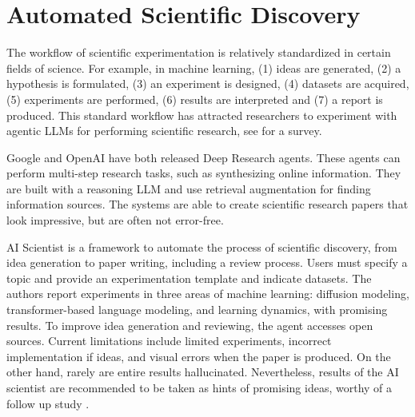 

\section{Automated Scientific Discovery}
The workflow of scientific experimentation is relatively standardized in certain fields of science. For example, in machine learning, (1) ideas are generated, (2) a hypothesis is formulated, (3) an experiment is designed, (4) datasets are acquired, (5) experiments are performed, (6) results are interpreted and (7) a report is produced. This standard workflow has attracted researchers to experiment with agentic LLMs for performing scientific research, see \citet{eger2025transforming} for a survey. 

Google and OpenAI have both released Deep Research agents. These agents can perform multi-step research tasks, such as synthesizing online information. They are built with a reasoning LLM and use retrieval augmentation for finding information sources. The systems are able to create  scientific research papers that look impressive, but are often not error-free. 

AI Scientist \citep{lu2024ai} is a framework to automate the process of scientific discovery, from idea generation to paper writing, including a review process. Users must specify a topic and provide an experimentation template and indicate datasets. The authors report experiments in three areas of machine learning: diffusion
modeling, transformer-based language modeling, and learning dynamics, with promising results. To improve idea generation and reviewing, the agent accesses open sources. Current limitations include limited experiments, incorrect implementation if ideas, and visual errors when the paper is produced. On the other hand, rarely are entire results hallucinated.  Nevertheless, results of the AI scientist are recommended to be taken as hints of promising ideas, worthy of a follow up study \citep{lu2024ai}.

